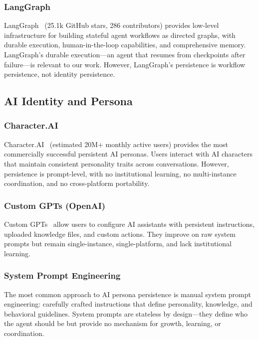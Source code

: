 \documentclass[11pt,a4paper]{article}
\begin{document}
\subsubsection{LangGraph}

LangGraph~\citep{langgraph2024} (25.1k GitHub stars, 286 contributors) provides low-level infrastructure for building stateful agent workflows as directed graphs, with durable execution, human-in-the-loop capabilities, and comprehensive memory. LangGraph's durable execution---an agent that resumes from checkpoints after failure---is relevant to our work. However, LangGraph's persistence is workflow persistence, not identity persistence.


\subsection{AI Identity and Persona}
\label{sec:ai-identity}

\subsubsection{Character.AI}

Character.AI~\citep{characterai2023} (estimated 20M+ monthly active users) provides the most commercially successful persistent AI personas. Users interact with AI characters that maintain consistent personality traits across conversations. However, persistence is prompt-level, with no institutional learning, no multi-instance coordination, and no cross-platform portability.


\subsubsection{Custom GPTs (OpenAI)}

Custom GPTs~\citep{customgpts2023} allow users to configure AI assistants with persistent instructions, uploaded knowledge files, and custom actions. They improve on raw system prompts but remain single-instance, single-platform, and lack institutional learning.


\subsubsection{System Prompt Engineering}

The most common approach to AI persona persistence is manual system prompt engineering: carefully crafted instructions that define personality, knowledge, and behavioral guidelines. System prompts are stateless by design---they define who the agent should be but provide no mechanism for growth, learning, or coordination.
\end{document}
